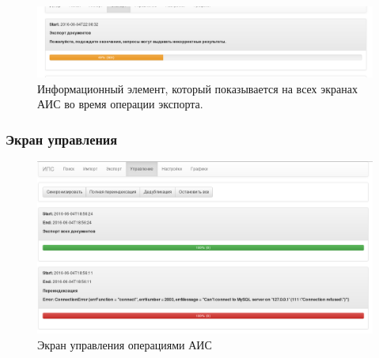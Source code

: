   \begin{figure}[h!]
  \centering
  \includegraphics[width=0.9\linewidth]{technology/gui_export_info}
  \caption{Информационный элемент, который показывается на всех экранах АИС во время операции экспорта.}
  \label{figure:guiExportInfo}
  \end{figure}

\clearpage
\subsubsection{Экран управления}

  \begin{figure}[h!]
  \centering
  \includegraphics[width=0.9\linewidth]{technology/gui_resync}
  \caption{Экран управления операциями АИС}
  \label{figure:guiResync}
  \end{figure}

